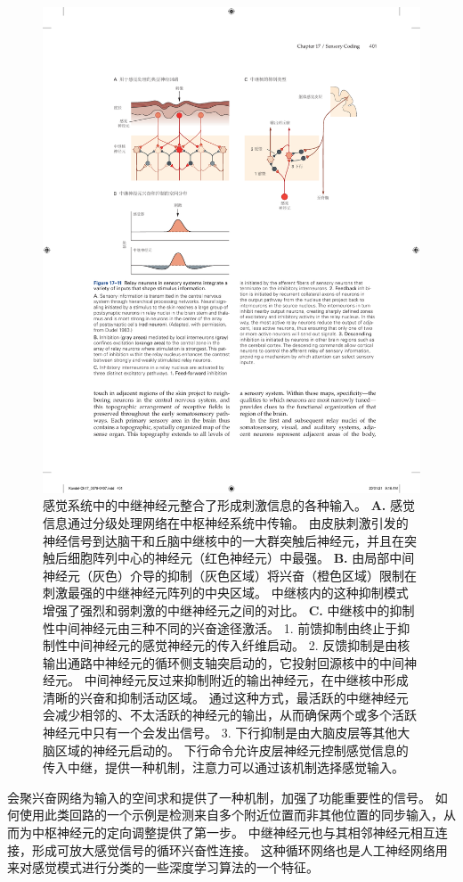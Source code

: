 \begin{figure}[htbp]
	\centering
	\includegraphics[width=0.7\linewidth]{chap17/fig_17_11}
	\caption{感觉系统中的中继神经元整合了形成刺激信息的各种输入。 
		\textbf{A.} 感觉信息通过分级处理网络在中枢神经系统中传输。 
		由皮肤刺激引发的神经信号到达脑干和丘脑中继核中的一大群突触后神经元，并且在突触后细胞阵列中心的神经元（红色神经元）中最强\cite{biederman2013human}。
		\textbf{B.} 由局部中间神经元（灰色）介导的抑制（灰色区域）将兴奋（橙色区域）限制在刺激最强的中继神经元阵列的中央区域。 
		中继核内的这种抑制模式增强了强烈和弱刺激的中继神经元之间的对比。 
		\textbf{C.} 中继核中的抑制性中间神经元由三种不同的兴奋途径激活。 
		1. 前馈抑制由终止于抑制性中间神经元的感觉神经元的传入纤维启动。 
		2. 反馈抑制是由核输出通路中神经元的循环侧支轴突启动的，它投射回源核中的中间神经元。 
		中间神经元反过来抑制附近的输出神经元，在中继核中形成清晰的兴奋和抑制活动区域。 
		通过这种方式，最活跃的中继神经元会减少相邻的、不太活跃的神经元的输出，从而确保两个或多个活跃神经元中只有一个会发出信号。 
		3. 下行抑制是由大脑皮层等其他大脑区域的神经元启动的。 
		下行命令允许皮层神经元控制感觉信息的传入中继，提供一种机制，注意力可以通过该机制选择感觉输入。}
	\label{fig:17_11}
\end{figure}


会聚兴奋网络为输入的空间求和提供了一种机制，加强了功能重要性的信号。 
如何使用此类回路的一个示例是检测来自多个附近位置而非其他位置的同步输入，从而为中枢神经元的定向调整提供了第一步。 
中继神经元也与其相邻神经元相互连接，形成可放大感觉信号的循环兴奋性连接。 
这种循环网络也是人工神经网络用来对感觉模式进行分类的一些深度学习算法的一个特征。


